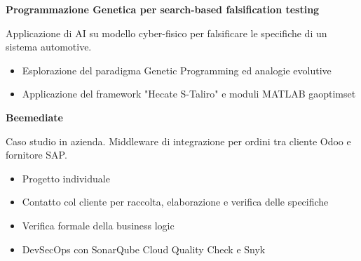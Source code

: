 \documentclass[a4paper]{letter}
\begin{document}
\begin{minipage}[t]{0.65\textwidth}
\vspace{1 mm}
{\large \textbf{Programmazione Genetica per search-based falsification testing}}

{\small Applicazione di AI su modello cyber-fisico per falsificare le specifiche di un sistema automotive. }

\vspace{1 mm}
\begin{itemize}
    \item Esplorazione del paradigma Genetic Programming ed analogie evolutive
    \item Applicazione del framework "Hecate S-Taliro" e moduli MATLAB gaoptimset
\end{itemize}

\vspace{1 mm}
{\large \textbf{Beemediate}}

{\small Caso studio in azienda. Middleware di integrazione per ordini tra cliente Odoo e fornitore SAP.}

\vspace{1 mm}
\begin{itemize}
    \item Progetto individuale
    \item Contatto col cliente per raccolta, elaborazione e verifica delle specifiche
    \item Verifica formale della business logic
    \item DevSecOps con SonarQube Cloud Quality Check e Snyk
\end{itemize}

\end{minipage}
\end{document}
